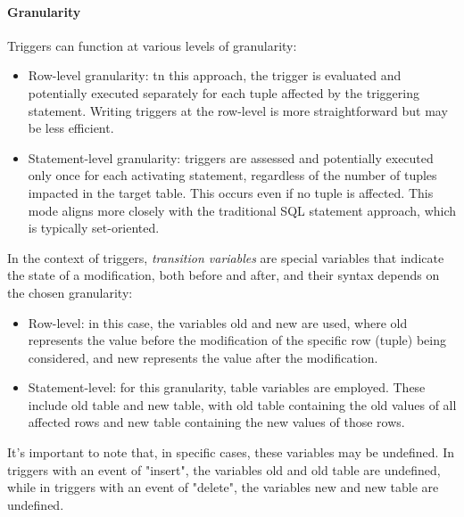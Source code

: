 \paragraph*{Granularity}
Triggers can function at various levels of granularity:
\begin{itemize}
    \item Row-level granularity: tn this approach, the trigger is evaluated and potentially executed separately for each tuple affected by the triggering statement. 
        Writing triggers at the row-level is more straightforward but may be less efficient.
    \item Statement-level granularity: triggers are assessed and potentially executed only once for each activating statement, regardless of the number of tuples impacted in the target table. 
        This occurs even if no tuple is affected. 
        This mode aligns more closely with the traditional SQL statement approach, which is typically set-oriented.
\end{itemize}
\begin{definition}
    In the context of triggers, \emph{transition variables} are special variables that indicate the state of a modification, both before and after, and their syntax depends on the chosen granularity:
    \begin{itemize}
        \item Row-level: in this case, the variables old and new are used, where old represents the value before the modification of the specific row (tuple) being considered, and new represents the value after the modification.
        \item Statement-level: for this granularity, table variables are employed. 
            These include old table and new table, with old table containing the old values of all affected rows and new table containing the new values of those rows.
    \end{itemize}
\end{definition}
It's important to note that, in specific cases, these variables may be undefined. 
In triggers with an event of "insert", the variables old and old table are undefined, while in triggers with an event of "delete", the variables new and new table are undefined.  
